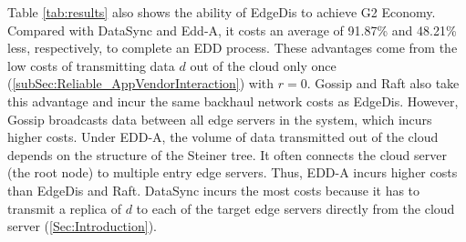 \documentclass[10pt,journal,compsoc]{IEEEtran}
\makeatletter
\newcommand\tabcaption{\def\@captype{table}\caption}
\makeatother
\begin{document}
\setlength{\textfloatsep}{4pt}
\begin{table}[!tb]
    \centering
    \renewcommand{\arraystretch}{1.2}
    \tabcaption{Performance Comparison}
    \vspace{-1em}
    \label{tab:results}
    \centering
\end{table}





Table \ref{tab:results} also shows the ability of EdgeDis to achieve G2 Economy. Compared with DataSync and Edd-A, it costs an average of 91.87\% and 48.21\% less, respectively, to complete an EDD process. These advantages come from the low costs of transmitting data $d$ out of the cloud only once (\cref{subSec:Reliable_AppVendorInteraction}) with $r=0$. Gossip and Raft also take this advantage and incur the same backhaul network costs as EdgeDis. However, Gossip broadcasts data between all edge servers in the system, which incurs higher costs. Under EDD-A, the volume of data transmitted out of the cloud depends on the structure of the Steiner tree. It often connects the cloud server (the root node) to multiple entry edge servers. Thus, EDD-A incurs higher costs than EdgeDis and Raft. DataSync incurs the most costs because it has to transmit a replica of $d$ to each of the target edge servers directly from the cloud server (\cref{Sec:Introduction}).
\end{document}
